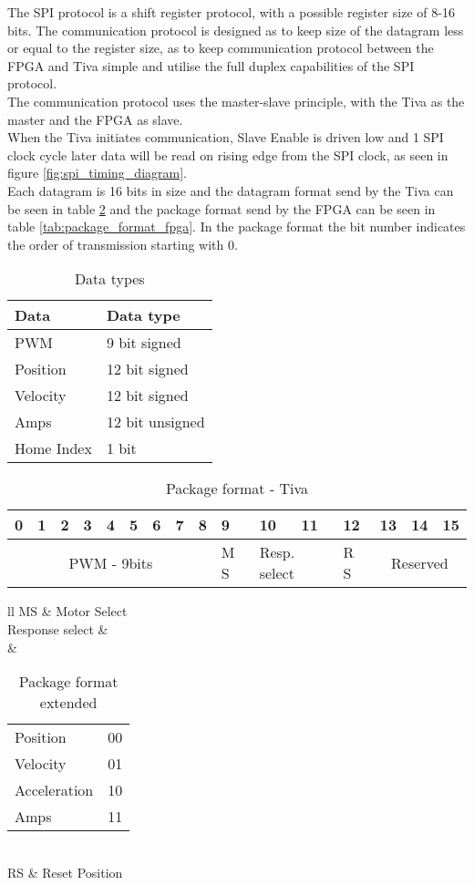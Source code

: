 \documentclass[../../../main]{subfiles}
\begin{document}
The SPI protocol is a shift register protocol, with a possible register size of 8-16 bits.
The communication protocol is designed as to keep size of the datagram less or equal to the register size, as to keep communication protocol between the FPGA and Tiva simple and utilise the full duplex capabilities of the SPI protocol. \\
The communication protocol uses the master-slave principle, with the Tiva as the master and the FPGA as slave.\\
When the Tiva initiates communication, Slave Enable is driven low and 1 SPI clock cycle later
data will be read on rising edge from the SPI clock, as seen in figure \ref{fig:spi_timing_diagram}.
\\
Each datagram is 16 bits in size and the datagram format send by the Tiva
can be seen in table \ref{tab:package_format_tiva} and the package format send by the FPGA
can be seen in table \ref{tab:package_format_fpga}.
In the package format the bit number indicates the order of transmission starting with 0.

\begin{table}[h]
	\centering
	\begin{tabular}{ll}
		\textbf{Data}& \textbf{Data type}  \\
		\hline
		PWM& 9 bit signed \\
		Position& 12 bit signed \\
		Velocity& 12 bit signed \\
		Amps& 12 bit unsigned \\
		Home Index& 1 bit
	\end{tabular}
	\caption{Data types}
	\label{tab:spi_datatypes}
\end{table}

\begin{table}[h]
	\centering
	\begin{tabular}{|*{16}{p{.3cm}|}}
		\hline
		0&1&2&3&4&5&6&7&8&9&10&11&12&13&14&15\\
		\hline
		\multicolumn{9}{|c|}{PWM  - 9bits} & M S&
		\multicolumn{2}{p{.6cm}|}{Resp. select}& R S&
		\multicolumn{3}{c|}{Reserved}
		\\
		\hline
	\end{tabular}
	\caption{Package format - Tiva}
	\label{tab:package_format_tiva}
\end{table}
\begin{table}[h]
	\centering
	\begin{tabular}{ll}
		MS & Motor Select\\
		\hline
		Response select &\\ &
		\begin{tabular}{ll}
			Position & 00\\
			Velocity & 01\\
			Acceleration & 10\\
			Amps & 11
		\end{tabular}
		\\\hline
		RS & Reset Position
		\\\hline
	\end{tabular}
	\caption{Package format extended}
	\label{tab:shorthand}
\end{table}
\end{document}
